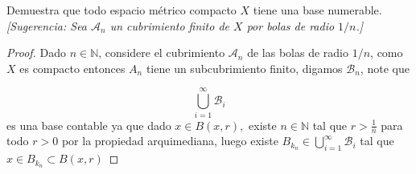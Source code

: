 
\item Demuestra que todo espacio métrico compacto $X$ tiene una base numerable. \textit{[Sugerencia: Sea $\mathcal{A}_n$ un cubrimiento finito de $X$ por bolas de radio $1/n$.]}

\begin{proof}
    Dado $n\in \mathbb{N}$, considere el cubrimiento $\mathcal{A}_n$ de las bolas de radio $1/n$, como $X$ es compacto entonces $A_n$ tiene un subcubrimiento finito, digamos $\mathcal{B}_n$, note que

    $$\bigcup_{i=1}^{\infty}\mathcal{B}_i 
        $$
    es una base contable ya que dado $x\in B(x,r),$ existe  $n\in \mathbb{N}$ tal que $r>\frac{1}{n}$ para todo $r>0$ por la propiedad arquimediana, luego existe $B_{k_n}\in \bigcup_{i=1}^{\infty}\mathcal{B}_i $ tal que $x\in B_{k_n}\subset B(x,r)$
\end{proof}